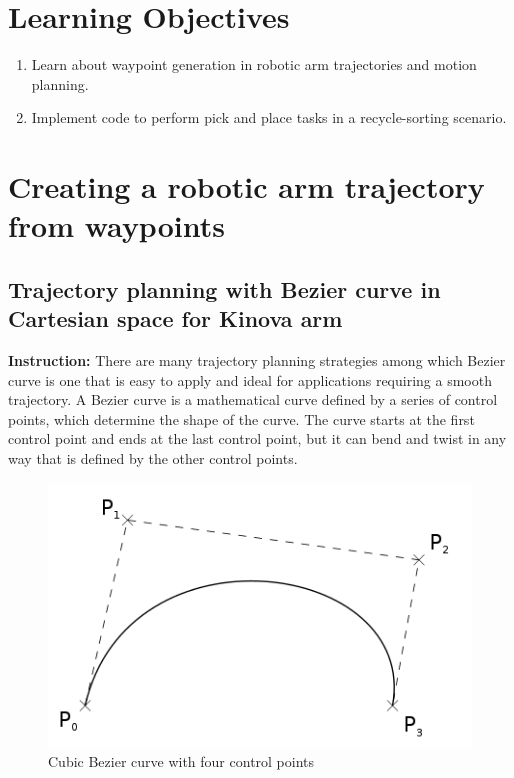 \documentclass[12pt]{article}
\begin{document}
	\MakeScribeTop


\section{Learning Objectives}

\begin{enumerate}
    \item Learn about waypoint generation in robotic arm trajectories and motion planning.
    \item Implement code to perform pick and place tasks in a recycle-sorting scenario.
\end{enumerate}


\section{Creating a robotic arm trajectory from waypoints}

\subsection{Trajectory planning with Bezier curve in Cartesian space for Kinova arm}

\textbf{Instruction:}
There are many trajectory planning strategies among which Bezier curve is one that is easy to apply and ideal for applications requiring a smooth trajectory. A Bezier curve is a mathematical curve defined by a series of control points, which determine the shape of the curve. The curve starts at the first control point and ends at the last control point, but it can bend and twist in any way that is defined by the other control points.

\begin{figure}[H]
    \centering\includegraphics[width=12cm]{images/bezier.png}\vspace{-10pt}
    \caption{Cubic Bezier curve with four control points}\label{fig:curves}
\end{figure}
\end{document}
